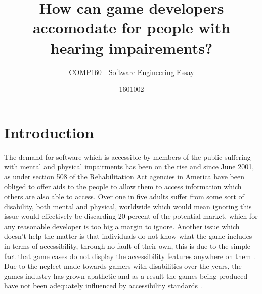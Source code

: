 \documentclass{scrartcl}
\title{How can game developers accomodate for people with hearing impairements?}
\subtitle{COMP160 - Software Engineering Essay}
\author{1601002}
\begin{document}
\maketitle


\section{Introduction}
The demand for software which is accessible by members of the public suffering with mental and physical impairments has been on the rise and since June 2001, as under section 508 of the Rehabilitation Act \cite{cohen2005accessibility} agencies in America have been obliged to offer aids to the people to allow them to access information which others are also able to access. Over one in five adults suffer from some sort of disability, both mental and physical, worldwide \cite{sierkowski2002achieving} which would mean ignoring this issue would effectively be discarding 20 percent of the potential market, which for any reasonable developer is too big a margin to ignore.  Another issue which doesn't help the matter is that individuals do not know what the game includes in terms of accessibility, through no fault of their own, this is due to the simple fact that game cases do not display the accessibility features anywhere on them \cite {bierre2005game}. Due to the neglect made towards gamers with disabilities over the years, the games industry has grown apathetic and as a result the games being produced have not been adequately influenced by accessibility standards \cite{porter2013empirical}.
\end{document}
